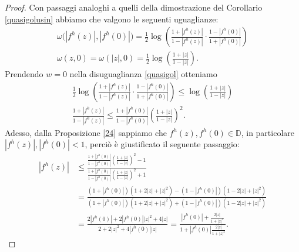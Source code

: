 \begin{proof}
  Con passaggi analoghi a quelli della dimostrazione del Corollario \ref{quasigolusin} abbiamo che valgono le seguenti uguaglianze:
  \begin{gather*}
    \omega\bigl(|f^h(z)|,|f^h(0)|\bigr)=\frac{1}{2}\log\left(\frac{1+|f^h(z)|}{1-|f^h(z)|}\cdot\frac{1-|f^h(0)|}{1+|f^h(0)|}\right)\\
    \omega(z, 0)=\omega(|z|,0)=\frac{1}{2}\log\left(\frac{1+|z|}{1-|z|}\right).
  \end{gather*}
  Prendendo $w=0$ nella disuguaglianza \eqref{quasigol} otteniamo
  \begin{align}
    \nonumber \frac{1}{2}\log\left(\frac{1+|f^h(z)|}{1-|f^h(z)|}\cdot\frac{1-|f^h(0)|}{1+|f^h(0)|}\right) \le \log\left(\frac{1+|z|}{1-|z|}\right) \\
    \frac{1+|f^h(z)|}{1-|f^h(z)|} \le \frac{1+|f^h(0)|}{1-|f^h(0)|}\left(\frac{1+|z|}{1-|z|}\right)^2. \label{golprimo}
  \end{align}
  Adesso, dalla Proposizione \ref{24} sappiamo che $f^h(z),f^h(0) \in \mathbb{D}$, in particolare $|f^h(z)|,|f^h(0)|<1$, perciò è giustificato il seguente passaggio:
  \begin{align*}
    |f^h(z)| & \le \frac{\frac{1+|f^h(0)|}{1-|f^h(0)|}\left(\frac{1+|z|}{1-|z|}\right)^2-1}{\frac{1+|f^h(0)|}{1-|f^h(0)|}\left(\frac{1+|z|}{1-|z|}\right)^2+1} \\
    & =\frac{(1+|f^h(0)|)(1+2|z|+|z|^2)-(1-|f^h(0)|)(1-2|z|+|z|^2)}{(1+|f^h(0)|)(1+2|z|+|z|^2)+(1-|f^h(0)|)(1-2|z|+|z|^2)} \\
    & =\frac{2|f^h(0)|+2|f^h(0)||z|^2+4|z|}{2+2|z|^2+4|f^h(0)||z|}=\frac{|f^h(0)|+\frac{2|z|}{1+|z|^2}}{1+|f^h(0)|\frac{2|z|}{1+|z|^2}}.
  \end{align*}
\end{proof}

